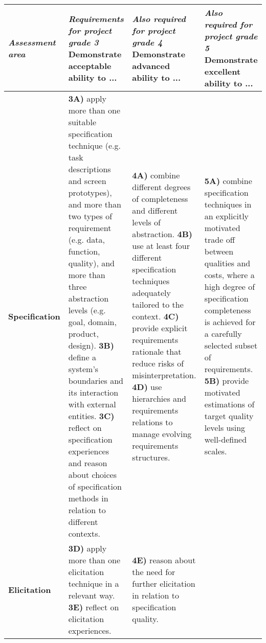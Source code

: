 \documentclass[10pt,a4paper]{article}
\begin{document}
\newpage

\begin{tabular}{| p{2.3cm} |p{7cm} | p{7cm} | p{7cm} |}
\hline
{\it Assessment area} & {\it Requirements for project grade {\bf 3}} \newline Demonstrate {\bf acceptable} ability to ... & {\it Also required for project grade {\bf 4}} \newline Demonstrate {\bf advanced} ability to ...& {\it Also required for project grade {\bf 5}} \newline Demonstrate {\bf excellent} ability to ... \\
\hline
\hline
{\bf Specification} & 
	{\bf 3A)} apply more than one suitable specification technique (e.g. task descriptions and screen prototypes), and more than two types of requirement (e.g. data, function, quality), and more than three abstraction levels (e.g. goal, domain, product, design). \newline
	{\bf 3B)} define a system's boundaries and its interaction with external entities. \newline
	{\bf 3C)} reflect on specification experiences and reason about choices of specification methods in relation to different contexts. & 
	{\bf 4A)} combine different degrees of completeness and different levels of abstraction. \newline
	{\bf 4B)} use at least four different specification techniques adequately tailored to the context. \newline
	{\bf 4C)} provide explicit requirements rationale that reduce risks of misinterpretation. \newline
	{\bf 4D)} use hierarchies and requirements relations to manage evolving requirements structures. &
	{\bf 5A)} combine specification techniques in an explicitly motivated trade off between qualities and costs, where a high degree of specification completeness is achieved for a carefully selected subset of requirements. 	\newline
	{\bf 5B)} provide motivated estimations of target quality levels using well-defined scales. 
\\ \hline

{\bf Elicitation}  & 
	{\bf 3D)} apply more than one elicitation technique in a relevant way. \newline
	{\bf 3E)} reflect on elicitation experiences. &
	
	{\bf 4E)} reason about the need for further elicitation in relation to specification quality.& 


\end{tabular}
\end{document}
